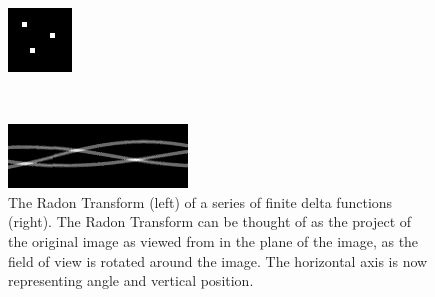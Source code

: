             \begin{figure}[ht]
                \centering
                \begin{minipage}[c]{0.2\linewidth}
                    \centering
                    \includegraphics[width=\textwidth]{Files/report_images/radon_transform_deltas_original.png}
                \end{minipage}
                ~
                \begin{minipage}[c]{0.5\linewidth}
                    \centering
                    \includegraphics[width=\textwidth]{Files/report_images/radon_transform_deltas.png}
                \end{minipage}
                \caption{The Radon Transform (left) of a series of finite delta functions (right). The Radon Transform can be thought of as the project of the original image as viewed from in the plane of the image, as the field of view is rotated around the image. The horizontal axis is now representing angle and vertical position.\label{fig:delta_radon_transform}}
            \end{figure}


